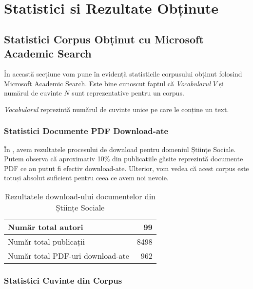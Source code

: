 \chapter{Statistici si Rezultate Obținute}


\section{Statistici Corpus Obținut cu Microsoft Academic Search}

În această secțiune vom pune în evidență statisticile corpusului obținut folosind Microsoft Academic Search. Este bine cunoscut faptul că \textit{Vocabularul} $V$ și numărul de cuvinte $N$ sunt reprezentative pentru un corpus.


\textit{Vocabularul} reprezintă numărul de cuvinte unice pe care le conține un text.


\subsection{Statistici Documente PDF Download-ate}

În , avem rezultatele procesului de download pentru domeniul Științe Sociale. Putem observa că aproximativ 10\% din publicațiile găsite reprezintă documente PDF ce au putut fi efectiv download-ate. Ulterior, vom vedea că acest corpus este totuși absolut suficient pentru ceea ce avem noi nevoie.

\begin{center}
\begin{table}[htb]
  \caption{Rezultatele download-ului documentelor din Științe Sociale}
  \begin{tabular}{|l|r|}
    \hline
    Număr total autori & 99 \\
    \hline
    Număr total publicații & 8498 \\
     \hline
    Număr total PDF-uri download-ate & 962  \\
     \hline
  \end{tabular}
  \label{table:downloaded-pdf-summary}
\end{table}
\end{center}

\subsection{Statistici Cuvinte din Corpus}


